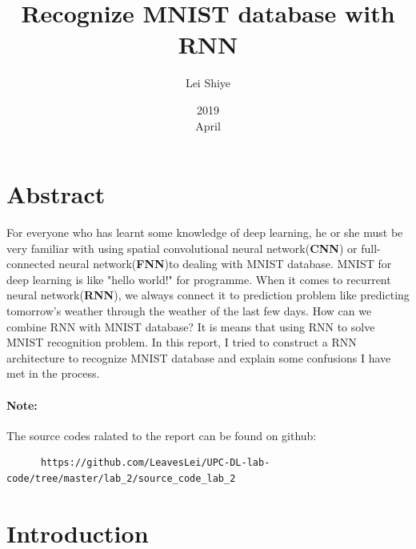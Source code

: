 \documentclass[a4paper,10pt]{article}
\begin{document}
%
   \title{Recognize MNIST database with RNN}

   \author{Lei Shiye}
          
   \date{2019\\ April}

   \maketitle
 
  \newpage
    
\section*{Abstract}
For everyone who has learnt some knowledge of deep learning, he or she must be very familiar with using spatial convolutional neural network(\textbf{CNN}) or full-connected neural network(\textbf{FNN})to dealing with MNIST database. MNIST for deep learning is like "hello world!" for programme. When it comes to recurrent neural network(\textbf{RNN}), we always connect it to prediction problem like predicting tomorrow's weather through the weather of the last few days. How can we combine RNN with MNIST database? It is means that using RNN to solve MNIST recognition problem. In this report, I tried to construct a RNN architecture to recognize MNIST database and explain some confusions I have met in the process. 


\paragraph{Note:}
The source codes ralated to the report can be found on github:
\begin{verbatim} 
      https://github.com/LeavesLei/UPC-DL-lab-code/tree/master/lab_2/source_code_lab_2
\end{verbatim}

\section{Introduction}
\end{document}
